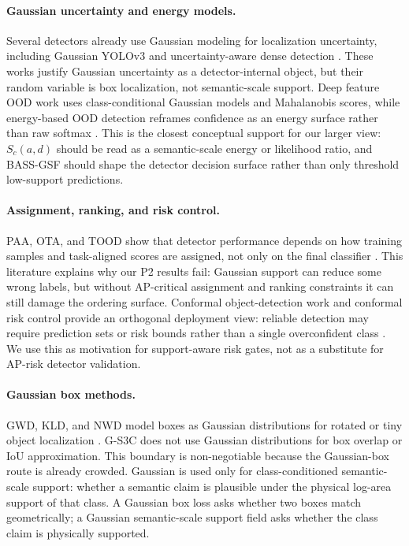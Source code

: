 \documentclass[10pt]{article}
\begin{document}
\paragraph{Gaussian uncertainty and energy models.}
Several detectors already use Gaussian modeling for localization uncertainty,
including Gaussian YOLOv3 and uncertainty-aware dense detection
\cite{choi2019gaussianyolo,park2021uadet}.  These works justify Gaussian
uncertainty as a detector-internal object, but their random variable is box
localization, not semantic-scale support.  Deep feature OOD work uses
class-conditional Gaussian models and Mahalanobis scores, while energy-based
OOD detection reframes confidence as an energy surface rather than raw softmax
\cite{lee2018mahalanobis,liu2020energyood}.  This is the closest conceptual
support for our larger view: $S_c(a,d)$ should be read as a semantic-scale
energy or likelihood ratio, and BASS-GSF should shape the detector decision
surface rather than only threshold low-support predictions.

\paragraph{Assignment, ranking, and risk control.}
PAA, OTA, and TOOD show that detector performance depends on how training
samples and task-aligned scores are assigned, not only on the final classifier
\cite{kim2020paa,ge2021ota,feng2021tood}.  This literature explains why our
P2 results fail: Gaussian support can reduce some wrong labels, but without
AP-critical assignment and ranking constraints it can still damage the
ordering surface.  Conformal object-detection work and conformal risk control
provide an orthogonal deployment view: reliable detection may require
prediction sets or risk bounds rather than a single overconfident class
\cite{andeol2023conformalrisk}.  We use this as motivation for support-aware
risk gates, not as a substitute for AP-risk detector validation.

\paragraph{Gaussian box methods.}
GWD, KLD, and NWD model boxes as Gaussian distributions for rotated or tiny
object localization \cite{yang2021gwd,yang2021kld,wang2021nwd}.  G-S3C does
not use Gaussian distributions for box overlap or IoU approximation.  This
boundary is non-negotiable because the Gaussian-box route is already crowded.
Gaussian is used only for class-conditioned semantic-scale support: whether a
semantic claim is plausible under the physical log-area support of that class.
A Gaussian box loss asks whether two boxes match geometrically; a Gaussian
semantic-scale support field asks whether the class claim is physically
supported.
\end{document}
